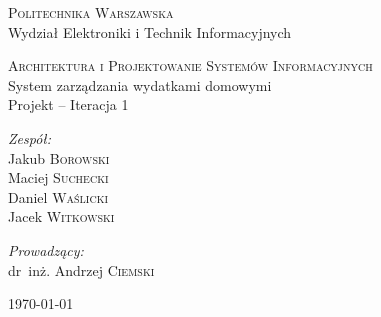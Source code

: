 \documentclass[11pt,a4paper]{article}
\begin{document}
\begin{titlepage}
  \begin{center}

    \textsc{\Large Politechnika Warszawska}\\[0.1cm]
    \small Wydział Elektroniki i Technik Informacyjnych
    \vfill

    \textsc{\small Architektura i Projektowanie Systemów Informacyjnych}\\[0.1cm]
    \Huge System zarządzania wydatkami domowymi\\[1.5cm]
    \small Projekt -- Iteracja 1\\[2.5cm]

    \vfill

    \begin{minipage}{0.4\textwidth}
      \begin{flushleft} \large
        \emph{Zespół:}\\[0.1cm]
        Jakub \textsc{Borowski}\\
        Maciej \textsc{Suchecki}\\
        Daniel \textsc{Waślicki}\\
        Jacek \textsc{Witkowski}\\
      \end{flushleft}
    \end{minipage}
    \begin{minipage}{0.4\textwidth}
      \begin{flushright} \large
        \emph{Prowadzący:}\\[0.1cm]
        dr~inż. Andrzej \textsc{Ciemski}\\[1cm]
      \end{flushright}
    \end{minipage}

    \vfill
    {\large \today}

  \end{center}
\end{titlepage}

\newpage
\tableofcontents

\newpage

\newpage

\newpage

%
%
%
\end{document}
